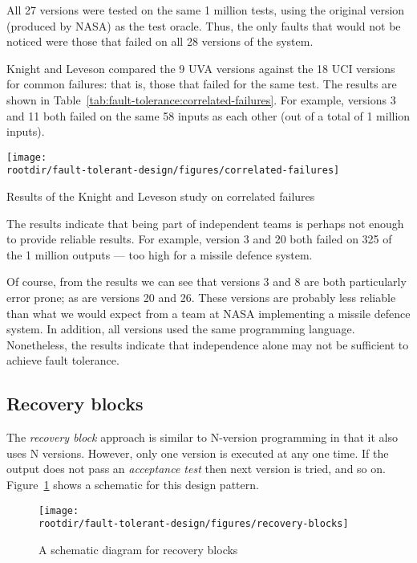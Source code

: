 All 27 versions were tested on the same 1 million tests, using the original version (produced by NASA) as the test oracle. Thus, the only faults that would not be noticed were those that failed on all 28 versions of the system.

Knight and Leveson compared the 9 UVA versions against the 18 UCI versions for common failures: that is, those that failed for the same test. The results are shown in Table~\ref{tab:fault-tolerance:correlated-failures}. For example, versions 3 and 11 both failed on the same 58 inputs as each other (out of a total of 1 million inputs).

\begin{table}[!h]
 \centering
 \texttt{[image: \\rootdir/fault-tolerant-design/figures/correlated-failures]}
 \caption{Results of the Knight and Leveson study on correlated failures}
 \label{tab:fault-tolerance:correlated-failures}
\end{table}

The results indicate that being part of independent teams is perhaps not enough to provide reliable results. For example, version 3 and 20 both failed on 325 of the 1 million outputs --- too high for a missile defence system.

Of course, from the results we can see that versions 3 and 8 are both particularly error prone; as are versions 20 and 26. These versions are probably less reliable than what we would expect from a team at NASA implementing a missile defence system. In addition, all versions used the same programming language. Nonetheless, the results indicate that independence alone may not be sufficient to achieve fault tolerance.

\subsection{Recovery blocks}

The \emph{recovery block} approach is similar to N-version programming in that it also uses N versions. However, only one version is executed at any one time. If the output does not pass an \emph{acceptance test} then next version is tried, and so on. Figure~\ref{fig:fault-tolerance:recovery-blocks} shows a schematic for this design pattern.

\begin{figure}[!h]
 \centering
 \texttt{[image: \\rootdir/fault-tolerant-design/figures/recovery-blocks]}
 \caption{A schematic diagram for recovery blocks}
 \label{fig:fault-tolerance:recovery-blocks}
\end{figure}

